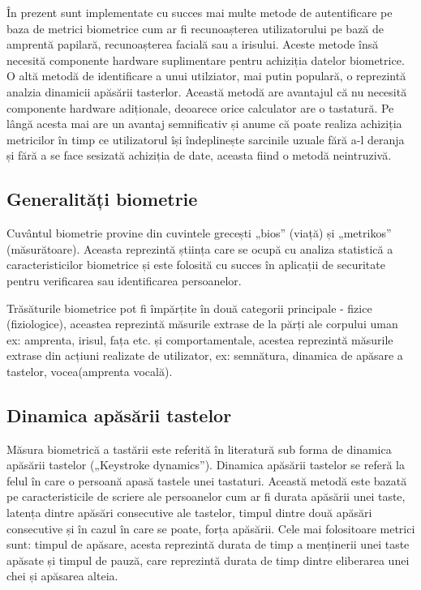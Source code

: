 \documentclass[9pt,shortpaper,twoside,web]{ieeecolor}
\begin{document}
	În prezent sunt implementate cu succes mai multe metode de autentificare pe baza de metrici biometrice cum ar fi recunoașterea utilizatorului pe bază de amprentă papilară, recunoașterea facială sau a irisului. Aceste metode însă necesită componente hardware suplimentare pentru achiziția datelor biometrice. O altă metodă de identificare a unui utilziator, mai putin populară, o reprezintă analzia dinamicii apăsării tasterlor. Această metodă are avantajul că nu necesită componente hardware adiționale, deoarece orice calculator are o tastatură. Pe lângă acesta mai are un avantaj semnificativ și anume că poate realiza achiziția metricilor în timp ce utilizatorul își îndeplinește sarcinile uzuale fără a-l deranja și fără a se face sesizată achiziția de date, aceasta fiind o metodă neintruzivă.


\subsection{Generalități biometrie}
	Cuvântul biometrie provine din cuvintele grecești „bios” (viață) și „metrikos” (măsurătoare). Aceasta reprezintă știința care se ocupă cu analiza statistică a caracteristicilor biometrice și este folosită cu succes în aplicații de securitate pentru verificarea sau identificarea persoanelor.

	Trăsăturile biometrice pot fi împărțite în două categorii principale - fizice (fiziologice), aceastea reprezintă măsurile extrase de la părți ale corpului uman ex: amprenta, irisul, fața etc. și comportamentale, acestea reprezintă măsurile extrase din acțiuni realizate de utilizator, ex: semnătura, dinamica de apăsare a tastelor, vocea(amprenta vocală).
	
	
\subsection{Dinamica apăsării tastelor}
	Măsura biometrică a tastării este referită în literatură sub forma de dinamica apăsării tastelor („Keystroke dynamics”). Dinamica apăsării tastelor se referă la felul în care o persoană apasă tastele unei tastaturi. Această metodă este bazată pe caracteristicile de scriere ale persoanelor cum ar fi durata apăsării unei taste, latența dintre apăsări consecutive ale tastelor, timpul dintre două apăsări consecutive și în cazul în care se poate, forța apăsării. Cele mai folositoare metrici sunt: timpul de apăsare, acesta reprezintă durata de timp a menținerii unei taste apăsate și timpul de pauză, care reprezintă durata de timp dintre eliberarea unei chei și apăsarea alteia.
\end{document}

